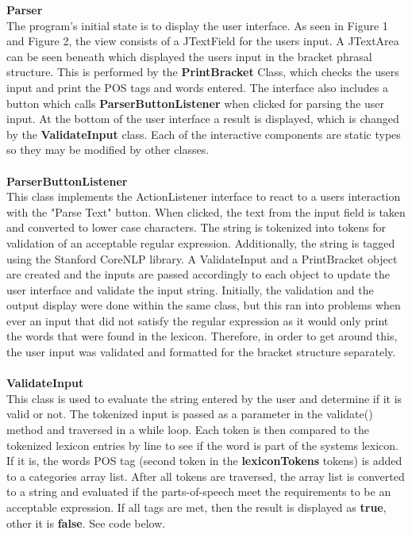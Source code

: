 \textbf{Parser}\\
The program's initial state is to display the user interface. As seen in Figure 1 and Figure 2, the view consists of a JTextField for the users input. A JTextArea can be seen beneath which displayed the users input in the bracket phrasal structure. This is performed by the \textbf{PrintBracket} Class, which checks the users input and print the POS tags and words entered. The interface also includes a button which calls \textbf{ParserButtonListener} when clicked for parsing the user input. At the bottom of the user interface a result is displayed, which is changed by the \textbf{ValidateInput} class. Each of the interactive components are static types so they may be modified by other classes.\\ \\
\textbf{ParserButtonListener} \\
This class implements the ActionListener interface to react to a users interaction with the "Parse Text" button. When clicked, the text from the input field is taken and converted to lower case characters. The string is tokenized into tokens for validation of an acceptable regular expression. Additionally, the string is tagged using the Stanford CoreNLP library. 
A ValidateInput and a PrintBracket object are created and the inputs are passed accordingly to each object to update the user interface and validate the input string. Initially, the validation and the output display were done within the same class, but this ran into problems when ever an input that did not satisfy the regular expression as it would only print the words that were found in the lexicon. Therefore, in order to get around this, the user input was validated and formatted for the bracket structure separately. \\ \\
\textbf{ValidateInput}\\
This class is used to evaluate the string entered by the user and determine if it is valid or not. The tokenized input is passed as a parameter in the validate() method and traversed in a while loop. Each token is then compared to the tokenized lexicon entries by line to see if the word is part of the systems lexicon. If it is, the words POS tag (second token in the \textbf{lexiconTokens} tokens) is added to a categories array list. After all tokens are traversed, the array list is converted to a string and evaluated if the parts-of-speech meet the requirements to be an acceptable expression. If all tags are met, then the result is displayed as \textbf{true}, other it is \textbf{false}. See code below.

